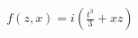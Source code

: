 \documentclass[preview]{standalone}
\begin{document}
\begin{align*}
f(z,x) = i(\frac{t^3}{3}+xz)
\end{align*}
\end{document}

